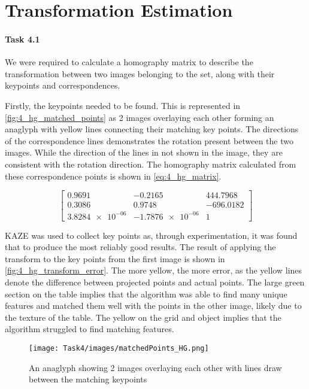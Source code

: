 \section{Transformation Estimation}

\paragraph{Task 4.1} We were required to calculate a homography matrix to describe the transformation between two images belonging to the \HG set, along with their keypoints and correspondences. 

Firstly, the keypoints needed to be found. This is represented in \autoref{fig:4_hg_matched_points} as 2 images overlaying each other forming an anaglyph with yellow lines connecting their matching key points. The directions of the correspondence lines demonstrates the rotation present between the two images. While the direction of the lines in not shown in the image, they are consistent with the rotation direction. The homography matrix calculated from these correspondence points is shown in \autoref{eq:4_hg_matrix}. 

\begin{equation}
    \begin{bmatrix}
        \num{0.9691} & \num{-0.2165} & \num{444.7968} \\
        \num{0.3086} & \num{0.9748} & \num{-696.0182} \\
        \num{3.8284e-06} & \num{-1.7876e-06} & \num{1}
    \end{bmatrix}
    \label{eq:4_hg_matrix}
\end{equation}

KAZE was used to collect key points as, through experimentation, it was found that to produce the most reliably good results. The result of applying the transform to the key points from the first image is shown in \autoref{fig:4_hg_transform_error}. The more yellow, the more error, as the yellow lines denote the difference between projected points and actual points. The large green section on the table implies that the algorithm was able to find many unique features and matched them well with the points in the other image, likely due to the texture of the table. The yellow on the grid and object implies that the algorithm struggled to find matching features.

\begin{figure}
    \centering
    \texttt{[image: Task4/images/matchedPoints\_HG.png]}
    \caption{An anaglyph showing 2 images overlaying each other with lines draw between the matching keypoints}
    \label{fig:4_hg_matched_points}
\end{figure}


